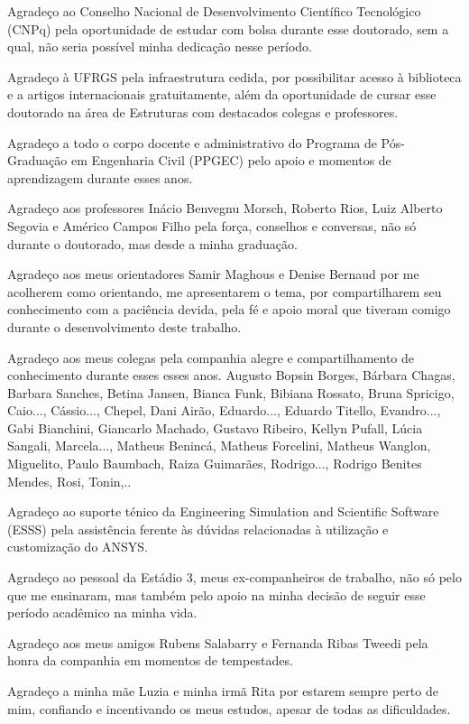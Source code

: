 Agradeço ao Conselho Nacional de Desenvolvimento Científico Tecnológico (CNPq) pela oportunidade de estudar com bolsa durante esse doutorado, sem a qual, não seria possível minha dedicação nesse período.

Agradeço à UFRGS pela infraestrutura cedida, por possibilitar acesso à biblioteca e a artigos internacionais gratuitamente, além da oportunidade de cursar esse doutorado na área de Estruturas com destacados colegas e professores.

Agradeço a todo o corpo docente e administrativo do Programa de Pós-Graduação em Engenharia Civil (PPGEC) pelo apoio e momentos de aprendizagem durante esses anos.

Agradeço aos professores Inácio Benvegnu Morsch, Roberto Rios, Luiz Alberto Segovia e Américo Campos Filho pela força, conselhos e conversas, não só durante o doutorado, mas desde a minha graduação.

Agradeço aos meus orientadores Samir Maghous e Denise Bernaud por me acolherem como orientando, me apresentarem o tema, por compartilharem seu conhecimento com a paciência devida, pela fé e apoio moral que tiveram comigo durante o desenvolvimento deste trabalho.

Agradeço aos meus colegas pela companhia alegre e compartilhamento de conhecimento durante esses esses anos. Augusto Bopsin Borges, Bárbara Chagas, Barbara Sanches, Betina Jansen, Bianca Funk, Bibiana Rossato, Bruna Spricigo, Caio..., Cássio..., Chepel, Dani Airão, Eduardo..., Eduardo Titello, Evandro..., Gabi Bianchini, Giancarlo Machado, Gustavo Ribeiro, Kellyn Pufall, Lúcia Sangali, Marcela..., Matheus Benincá, Matheus Forcelini, Matheus Wanglon, Miguelito, Paulo Baumbach, Raiza Guimarães, Rodrigo..., Rodrigo Benites Mendes, Rosi, Tonin,..

Agradeço ao suporte ténico da Engineering Simulation and Scientific Software (ESSS) pela assistência ferente às dúvidas relacionadas à utilização e customização do ANSYS.

Agradeço ao pessoal da Estádio 3, meus ex-companheiros de trabalho, não só pelo que me ensinaram, mas também pelo apoio na minha decisão de seguir esse período acadêmico na minha vida.

Agradeço aos meus amigos Rubens Salabarry e Fernanda Ribas Tweedi pela honra da companhia em momentos de tempestades.

Agradeço a minha mãe Luzia e minha irmã Rita por estarem sempre perto de mim, confiando e incentivando os meus estudos, apesar de todas as dificuldades.




